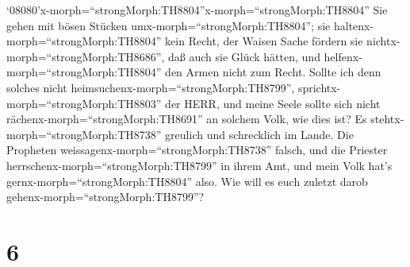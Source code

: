 `08080'\textbar x-morph=``strongMorph:TH8804''x-morph=``strongMorph:TH8804''
Sie gehen mit bösen Stücken umx-morph=``strongMorph:TH8804''; sie
haltenx-morph=``strongMorph:TH8804'' kein Recht, der Waisen Sache
fördern sie nichtx-morph=``strongMorph:TH8686'', daß auch sie Glück
hätten, und helfenx-morph=``strongMorph:TH8804'' den Armen nicht zum
Recht.  Sollte ich denn solches nicht
heimsuchenx-morph=``strongMorph:TH8799'',
sprichtx-morph=``strongMorph:TH8803'' der HERR, und meine Seele sollte
sich nicht rächenx-morph=``strongMorph:TH8691'' an solchem Volk, wie
dies ist?  Es stehtx-morph=``strongMorph:TH8738'' greulich
und schrecklich im Lande.  Die Propheten
weissagenx-morph=``strongMorph:TH8738'' falsch, und die Priester
herrschenx-morph=``strongMorph:TH8799'' in ihrem Amt, und mein Volk
hat's gernx-morph=``strongMorph:TH8804'' also. Wie will es euch zuletzt
darob gehenx-morph=``strongMorph:TH8799''?

\hypertarget{section-5}{%
\section{6}\label{section-5}}

